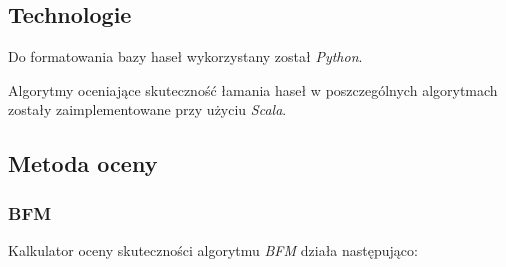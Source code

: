 \documentclass{article}
\begin{document}
	\subsection{Technologie}
	Do formatowania bazy haseł wykorzystany został \textit{Python}.
	
	Algorytmy oceniające skuteczność łamania haseł w poszczególnych algorytmach zostały zaimplementowane przy użyciu \textit{Scala}.

	
	\subsection{Metoda oceny}
	\subsubsection{BFM}
	Kalkulator oceny skuteczności algorytmu \textit{BFM} działa następująco:
\end{document}
